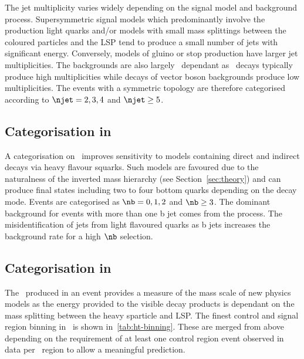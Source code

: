 The jet multiplicity varies widely depending on the signal model and background process.
Supersymmetric signal models which predominantly involve the production light quarks and/or models 
with small mass splittings between the coloured particles and the LSP tend to produce 
a small number of jets with significant energy. Conversely, models of gluino or stop production
have larger jet multiplicities. The backgrounds are also largely \njet~dependant as 
\ttbar~decays typically produce high multiplicities while decays of vector boson backgrounds
produce low multiplicities. The events with a symmetric topology are therefore categorised according
to $\njet = 2,3,4$ and $\njet \ge5$.

\subsection{Categorisation in \nb}

A categorisation on \nb~improves sensitivity to models containing direct and indirect
decays via heavy flavour squarks. Such models are favoured due to the naturalness of the
inverted mass hierarchy (see Section~\ref{sec:theory}) and can produce
final states including two to four bottom quarks depending on the decay mode.
Events are categorised as $\nb = 0,1,2$ and $\nb \ge3$. The dominant background for events 
with more than one b jet comes from the \ttbar process. The misidentification of 
jets from light flavoured quarks as b jets increases the background rate for a high $\nb$ selection.

\subsection{Categorisation in \scalht}

The \scalht~produced in an event provides a measure of the mass scale of 
new physics models as the energy provided to the visible decay products is
dependant on the mass splitting between the heavy sparticle and LSP. 
The finest control and signal region binning in \scalht~is shown in~\ref{tab:ht-binning}. 
These are merged from above depending on the requirement of at least one control region
event observed in data per \scalht~region to allow a meaningful prediction.

